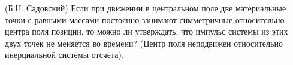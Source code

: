 (Б.Н. Садовский)
Если при движении в центральном поле две материальные точки с равными
массами постоянно занимают симметричные относительно центра поля
позиции, то можно ли утверждать, что импульс системы из этих двух точек
не меняется во времени? (Центр поля неподвижен относительно
инерциальной системы отсчёта).
